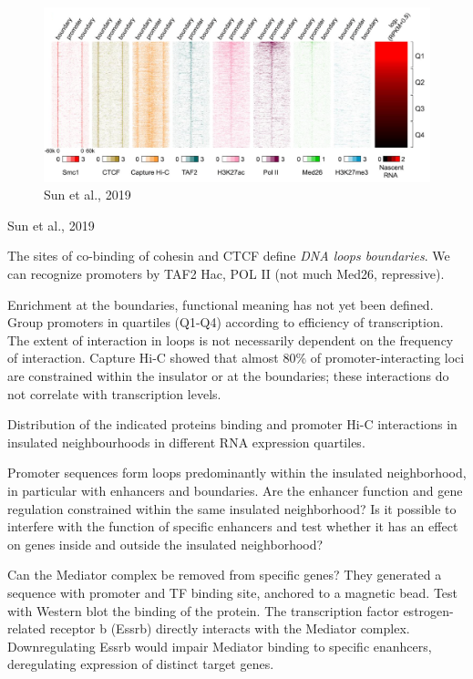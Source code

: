 \begin{figure}
\centering
\includegraphics[width=\textwidth]{../_resources/Screenshot_2022-10-19_at_10-01-09.png}
\caption{Sun et al., 2019}
\end{figure}

Sun et al., 2019

The sites of co-binding of cohesin and CTCF define \emph{DNA loops boundaries}. We can recognize promoters by TAF2 Hac, POL II (not much Med26, repressive).

Enrichment at the boundaries, functional meaning has not yet been defined. Group promoters in quartiles (Q1-Q4) according to efficiency of transcription. The extent of interaction in loops is not necessarily dependent on the frequency of interaction. Capture Hi-C showed that almost 80\% of promoter-interacting loci are constrained within the insulator or at the boundaries; these interactions do not correlate with transcription levels.

Distribution of the indicated proteins binding and promoter Hi-C interactions in insulated neighbourhoods in different RNA expression quartiles.

Promoter sequences form loops predominantly within the insulated neighborhood, in particular with enhancers and boundaries. Are the enhancer function and gene regulation constrained within the same insulated neighborhood? Is it possible to interfere with the function of specific enhancers and test whether it has an effect on genes inside and outside the insulated neighborhood?

Can the Mediator complex be removed from specific genes? They generated a sequence with promoter and TF binding site, anchored to a magnetic bead. Test with Western blot the binding of the protein. The transcription factor estrogen-related receptor b (Essrb) directly interacts with the Mediator complex. Downregulating Essrb would impair Mediator binding to specific enanhcers, deregulating expression of distinct target genes.

